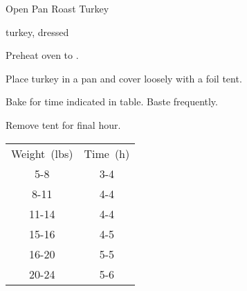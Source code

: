\begin{recipe}{Open Pan Roast Turkey}{}{}

\begin{ingredients}
\item turkey, dressed
\item 
\end{ingredients}

\begin{directions}
\item Preheat oven to .
\item Place turkey in a pan and cover loosely with a foil tent.
\item Bake for time indicated in table. Baste frequently.
\item Remove tent for final hour.
\end{directions}

\begin{tabular}{|cc|}
\hline
Weight~(lbs) & Time~(h) \\
5-8 & 3\quarter{}-4 \\
8-11 &  4-4\quarter{} \\
11-14 & 4\quarter{}-4\half{} \\
15-16 & 4\half{}-5 \\
16-20 & 5-5\threequarter{} \\
20-24 & 5\threequarter{}-6\half{} \\
\hline
\end{tabular}
\end{recipe}
